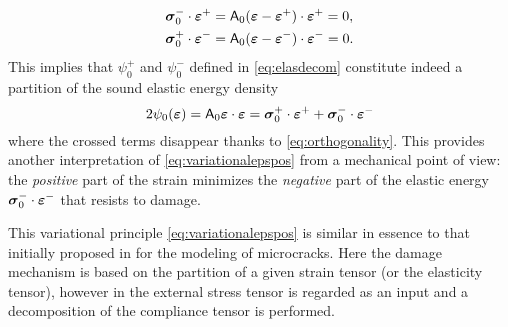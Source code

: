 \begin{equation} \label{eq:orthogonality}
\begin{aligned}
\sig_0^-\cdot\eps^+ &= \tens{A}_0(\eps-\eps^+)\cdot\eps^+=0, \\
\sig_0^+\cdot\eps^- &= \tens{A}_0(\eps-\eps^-)\cdot\eps^-=0.
\end{aligned}
\end{equation}
This implies that $\psi_0^+$ and $\psi_0^-$ defined in \eqref{eq:elasdecom} constitute indeed a partition of the sound elastic energy density
\[
2\psi_0(\eps)=\tens{A}_0\eps\cdot\eps=\sig_0^+\cdot\eps^++\sig_0^-\cdot\eps^-
\]
where the crossed terms disappear thanks to \eqref{eq:orthogonality}. This provides another interpretation of \eqref{eq:variationalepspos} from a mechanical point of view: the \emph{positive} part of the strain minimizes the \emph{negative} part of the elastic energy $\sig_0^-\cdot\eps^-$ that resists to damage.

\begin{remark}
This variational principle \eqref{eq:variationalepspos} is similar in essence to that initially proposed in \cite{Ortiz:1985} for the modeling of microcracks. Here the damage mechanism is based on the partition of a given strain tensor (or the elasticity tensor), however in \cite{Ortiz:1985} the external stress tensor is regarded as an input and a decomposition of the compliance tensor is performed.
\end{remark}

